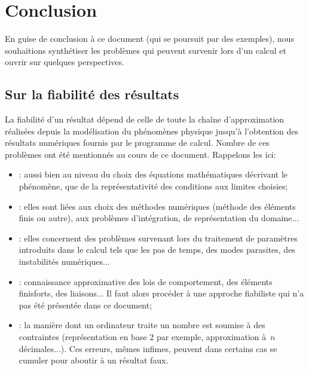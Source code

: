 \chapter*{Conclusion}\label{Ch-Ccl}


En guise de conclusion à ce document (qui se poursuit par des exemples), nous souhaitions synthétiser
les problèmes qui peuvent survenir lors d'un calcul et ouvrir sur quelques perspectives.



\medskip
\section*{Sur la fiabilité des résultats}

La fiabilité d'un résultat dépend de celle de toute la chaîne d'approximation réalisées depuis la modélisation
du phénomènes physique jusqu'à l'obtention des résultats numériques fournis par le programme de calcul.
Nombre de ces problèmes ont été mentionnés au cours de ce document. Rappelons les ici:
\begin{itemize}
  \item {}: aussi bien au niveau du choix des équations mathématiques décrivant le phénomène,
	que de la représentativité des conditions aux limites choisies;
  \item {}: elles sont liées aux choix des méthodes numériques (méthode des éléments finis ou autre), aux problèmes
	d'intégration, de représentation du domaine...
  \item {}: elles concernent des problèmes survenant lors du traitement de paramètres
	introduits dans le calcul tels que les pas de temps, des modes parasites, des instabilités numériques...
  \item {}: connaissance approximative des lois de comportement, des éléments finisforts,
	des liaisons... Il faut alors procéder à une approche fiabiliste qui n'a pas été présentée dans ce document;
  \item {}: la manière dont un ordinateur traite un nombre est soumise à des contraintes
	(représentation en base 2 par exemple, approximation à~$n$ décimales...). Ces erreurs, mêmes infimes, peuvent
	dans certains cas se cumuler pour aboutir à un résultat faux.
\end{itemize}

